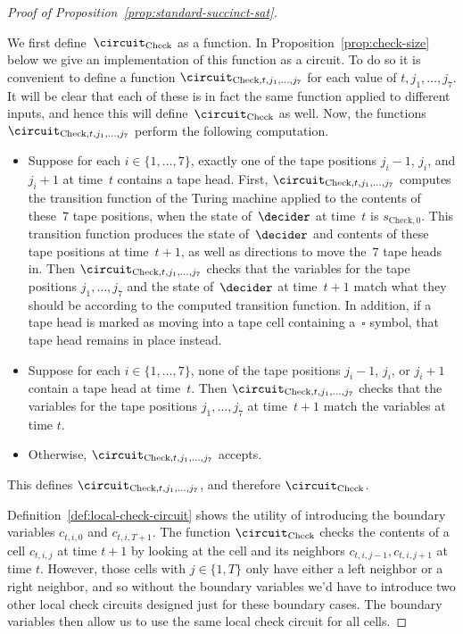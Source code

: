 \begin{proof}[Proof of Proposition~\ref{prop:standard-succinct-sat}]
\begin{definition}
    We first define~$\circuit_{\mathrm{Check}}$ as a function. In Proposition~\ref{prop:check-size} below we give an implementation of this function as a circuit. To do so it is convenient to define a function $\circuit_{\mathrm{Check},
      t, j_1, \ldots, j_7}$ for each value of $t, j_1, \ldots, j_7$.
    It will be clear that each of these is in fact the same function
    applied to different inputs, and hence this will
    define~$\circuit_{\mathrm{Check}}$ as well.
    Now, the functions~$\circuit_{\mathrm{Check}, t, j_1, \ldots, j_7}$ perform the following computation. 
    \begin{itemize}
    \item Suppose for each $i \in \{1, \ldots, 7\}$, exactly one of the tape
      positions $j_i-1$, $j_i$, and $j_i+1$ at time~$t$ contains a tape head.
      First, $\circuit_{\mathrm{Check}, t, j_1, \ldots, j_7}$ computes the
      transition function of the Turing machine applied to the contents of
      these~$7$ tape positions, when  the state of~$\decider$ at time~$t$ is $s_{\mathrm{Check}, 0}$. This transition function 
      produces the state of~$\decider$ and contents of these tape positions at
      time~$t+1$, as well as directions to move the~$7$ tape heads in.
      Then $\circuit_{\mathrm{Check}, t, j_1, \ldots, j_7}$ checks that the
      variables for the tape positions $j_1, \ldots, j_7$ and the state
      of~$\decider$ at time~$t+1$ match what they should be according to the computed transition function.
      In addition, if a tape head is marked as moving into a tape cell
      containing a~$\square$ symbol, that tape head remains in place instead.
    \item Suppose for each $i \in \{1, \ldots, 7\}$, none of the tape positions
      $j_i -1$, $j_i$, or $j_i+1$ contain a tape head at time~$t$.
      Then $\circuit_{\mathrm{Check}, t, j_1, \ldots, j_7}$ checks that the
      variables for the tape positions $j_1, \ldots, j_7$ at time~$t+1$ match
      the variables at time $t$.
    \item Otherwise, $\circuit_{\mathrm{Check}, t, j_1, \ldots, j_7}$ accepts.
    \end{itemize}
    This defines $\circuit_{\mathrm{Check}, t, j_1, \ldots, j_7}$, and therefore
    $\circuit_{\mathrm{Check}}$.
  \end{definition}

  Definition~\ref{def:local-check-circuit} shows the utility of introducing the
  boundary variables $c_{t, i, 0}$ and $c_{t, i, T+1}$.
  The function $\circuit_{\mathrm{Check}}$ checks the contents of a cell $c_{t,
    i, j}$ at time $t+1$ by looking at the cell and its neighbors $c_{t, i,
    j-1}, c_{t, i, j+1}$ at time $t$.
  However, those cells with $j \in \{1, T\}$ only have either a left neighbor or
  a right neighbor, and so without the boundary variables we'd have to introduce
  two other local check circuits designed just for these boundary cases.
  The boundary variables then allow us to use the same local check circuit for
  all cells.


\end{proof}
